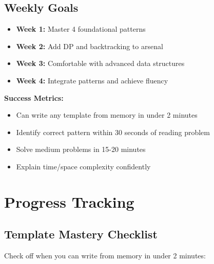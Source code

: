\documentclass[10pt,a4paper]{article}
\begin{document}
\subsection{Weekly Goals}
\begin{itemize}
\item \textbf{Week 1:} Master 4 foundational patterns
\item \textbf{Week 2:} Add DP and backtracking to arsenal
\item \textbf{Week 3:} Comfortable with advanced data structures
\item \textbf{Week 4:} Integrate patterns and achieve fluency
\end{itemize}

\begin{tipbox}
\textbf{Success Metrics:}
\begin{itemize}
\item Can write any template from memory in under 2 minutes
\item Identify correct pattern within 30 seconds of reading problem
\item Solve medium problems in 15-20 minutes
\item Explain time/space complexity confidently
\end{itemize}
\end{tipbox}

\section{Progress Tracking}

\subsection{Template Mastery Checklist}
Check off when you can write from memory in under 2 minutes:
\end{document}
